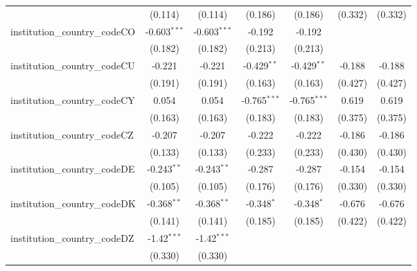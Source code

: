 \begin{tabular}{lcccccc}
                                         & (0.114)        & (0.114)        & (0.186)        & (0.186)        & (0.332)        & (0.332)\\   
   institution\_country\_codeCO          & -0.603$^{***}$ & -0.603$^{***}$ & -0.192         & -0.192         &                &   \\   
                                         & (0.182)        & (0.182)        & (0.213)        & (0.213)        &                &   \\   
   institution\_country\_codeCU          & -0.221         & -0.221         & -0.429$^{**}$  & -0.429$^{**}$  & -0.188         & -0.188\\   
                                         & (0.191)        & (0.191)        & (0.163)        & (0.163)        & (0.427)        & (0.427)\\   
   institution\_country\_codeCY          & 0.054          & 0.054          & -0.765$^{***}$ & -0.765$^{***}$ & 0.619          & 0.619\\   
                                         & (0.163)        & (0.163)        & (0.183)        & (0.183)        & (0.375)        & (0.375)\\   
   institution\_country\_codeCZ          & -0.207         & -0.207         & -0.222         & -0.222         & -0.186         & -0.186\\   
                                         & (0.133)        & (0.133)        & (0.233)        & (0.233)        & (0.430)        & (0.430)\\   
   institution\_country\_codeDE          & -0.243$^{**}$  & -0.243$^{**}$  & -0.287         & -0.287         & -0.154         & -0.154\\   
                                         & (0.105)        & (0.105)        & (0.176)        & (0.176)        & (0.330)        & (0.330)\\   
   institution\_country\_codeDK          & -0.368$^{**}$  & -0.368$^{**}$  & -0.348$^{*}$   & -0.348$^{*}$   & -0.676         & -0.676\\   
                                         & (0.141)        & (0.141)        & (0.185)        & (0.185)        & (0.422)        & (0.422)\\   
   institution\_country\_codeDZ          & -1.42$^{***}$  & -1.42$^{***}$  &                &                &                &   \\   
                                         & (0.330)        & (0.330)        &                &                &                &   \\   

\end{tabular}
